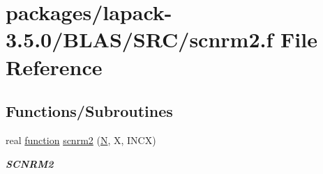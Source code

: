 \hypertarget{lapack-3_85_80_2BLAS_2SRC_2scnrm2_8f}{}\section{packages/lapack-\/3.5.0/\+B\+L\+A\+S/\+S\+R\+C/scnrm2.f File Reference}
\label{lapack-3_85_80_2BLAS_2SRC_2scnrm2_8f}
\subsection*{Functions/\+Subroutines}
\begin{DoxyCompactItemize}
\item 
real \hyperlink{afunc_8m_a7b5e596df91eadea6c537c0825e894a7}{function} \hyperlink{group__single__blas__level1_gab0d23a73e9fd79e8a9c304fd282ab03d}{scnrm2} (\hyperlink{polmisc_8c_a0240ac851181b84ac374872dc5434ee4}{N}, X, I\+N\+C\+X)
\begin{DoxyCompactList}\small\item\em {\bfseries S\+C\+N\+R\+M2} \end{DoxyCompactList}\end{DoxyCompactItemize}
